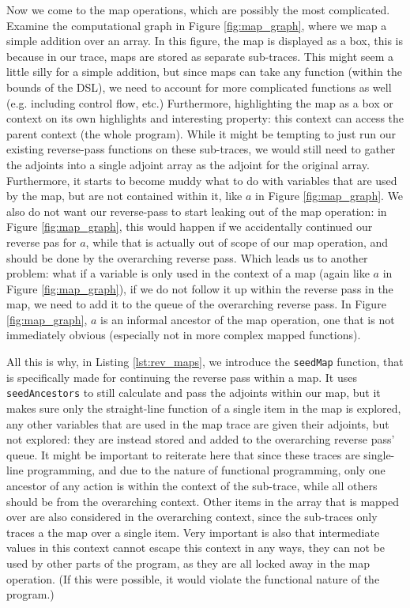         Now we come to the map operations, which are possibly the most complicated.
        Examine the computational graph in Figure \ref{fig:map_graph}, where we map a simple addition over an array.
        In this figure, the map is displayed as a box, this is because in our trace, maps are stored as separate sub-traces.
        This might seem a little silly for a simple addition, but since maps can take any function (within the bounds of the DSL), we need to account for more complicated functions as well (e.g. including control flow, etc.)
        Furthermore, highlighting the map as a box or context on its own highlights and interesting property: this context can access the parent context (the whole program).
        While it might be tempting to just run our existing reverse-pass functions on these sub-traces, we would still need to gather the adjoints into a single adjoint array as the adjoint for the original array.
        Furthermore, it starts to become muddy what to do with variables that are used by the map, but are not contained within it, like $a$ in Figure \ref{fig:map_graph}.
        We also do not want our reverse-pass to start leaking out of the map operation: in Figure \ref{fig:map_graph}, this would happen if we accidentally continued our reverse pas for $a$, while that is actually out of scope of our map operation, and should be done by the overarching reverse pass.
        Which leads us to another problem: what if a variable is only used in the context of a map (again like $a$ in Figure \ref{fig:map_graph}), if we do not follow it up within the reverse pass in the map, we need to add it to the queue of the overarching reverse pass.
        In Figure \ref{fig:map_graph}, $a$ is an informal ancestor of the map operation, one that is not immediately obvious (especially not in more complex mapped functions).
        
        All this is why, in Listing \ref{lst:rev_maps}, we introduce the \texttt{seedMap} function, that is specifically made for continuing the reverse pass within a map.
        It uses \texttt{seedAncestors} to still calculate and pass the adjoints within our map, but it makes sure only the straight-line function of a single item in the map is explored, any other variables that are used in the map trace are given their adjoints, but not explored: they are instead stored and added to the overarching reverse pass' queue.
        It might be important to reiterate here that since these traces are single-line programming, and due to the nature of functional programming, only one ancestor of any action is within the context of the sub-trace, while all others should be from the overarching context.
        Other items in the array that is mapped over are also considered in the overarching context, since the sub-traces only traces a the map over a single item.
        Very important is also that intermediate values in this context cannot escape this context in any ways, they can not be used by other parts of the program, as they are all locked away in the map operation.
        (If this were possible, it would violate the functional nature of the program.)

